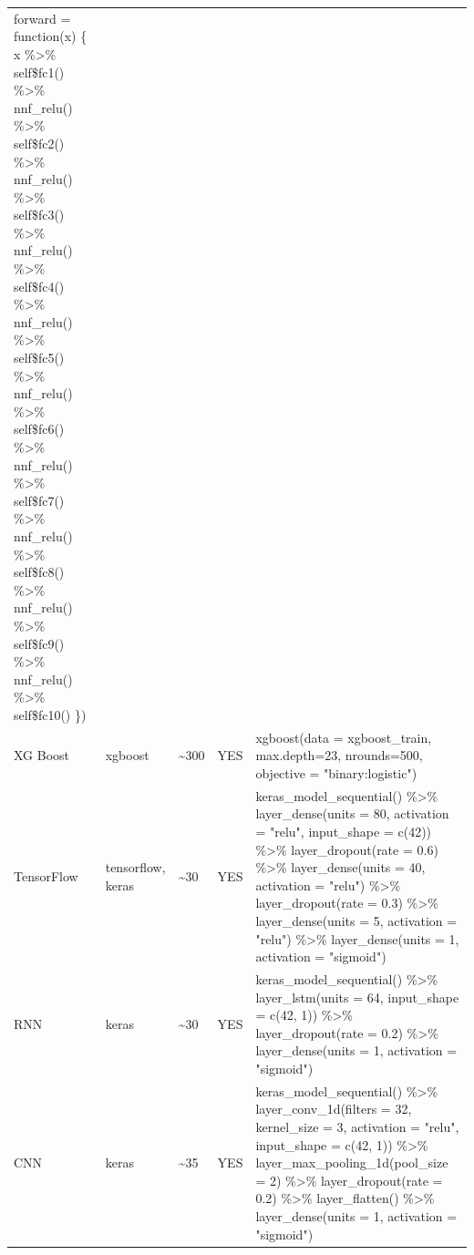 \documentclass[preprint, 3p,
authoryear]{elsarticle} %
\begin{document}
\begin{landscape}
\begin{table}[!h]
{\begin{tabular}[t]{>{\raggedright\arraybackslash}p{1cm}>{\raggedright\arraybackslash}p{1cm}>{\raggedright\arraybackslash}p{1cm}>{\raggedright\arraybackslash}p{1cm}>{\raggedright\arraybackslash}p{13cm}}
  forward = function(x) \{  x \%>\% 
      self\$fc1() \%>\%  nnf\_relu() \%>\%  self\$fc2() \%>\% nnf\_relu() \%>\% self\$fc3() \%>\%  nnf\_relu() \%>\% self\$fc4() \%>\% nnf\_relu() \%>\% self\$fc5() \%>\% nnf\_relu() \%>\% self\$fc6() \%>\%      nnf\_relu() \%>\%  self\$fc7() \%>\%  nnf\_relu() \%>\%  self\$fc8() \%>\%  nnf\_relu() \%>\% self\$fc9() \%>\%  nnf\_relu() \%>\% self\$fc10() \})\\
XG Boost & xgboost & \textasciitilde{}300 & YES & xgboost(data = xgboost\_train, max.depth=23, nrounds=500, objective = "binary:logistic")\\
TensorFlow & tensorflow, keras & \textasciitilde{}30 & YES & keras\_model\_sequential() \%>\% layer\_dense(units = 80, activation = "relu", input\_shape = c(42)) \%>\%  layer\_dropout(rate = 0.6) \%>\%  layer\_dense(units = 40, activation = "relu") \%>\%  layer\_dropout(rate = 0.3) \%>\%  layer\_dense(units = 5, activation = "relu") \%>\%   layer\_dense(units = 1, activation = "sigmoid")\\
RNN & keras & \textasciitilde{}30 & YES & keras\_model\_sequential() \%>\%  layer\_lstm(units = 64, input\_shape = c(42, 1)) \%>\%  layer\_dropout(rate = 0.2) \%>\%  layer\_dense(units = 1, activation = "sigmoid")\\
CNN & keras & \textasciitilde{}35 & YES & keras\_model\_sequential() \%>\%  layer\_conv\_1d(filters = 32, kernel\_size = 3, activation = "relu", input\_shape = c(42, 1)) \%>\%  layer\_max\_pooling\_1d(pool\_size = 2) \%>\%
layer\_dropout(rate = 0.2) \%>\%  layer\_flatten() \%>\%  layer\_dense(units = 1, activation = "sigmoid")\\
\bottomrule
\end{tabular}}
\end{table}
\end{landscape}

\renewcommand\refname{References}

\end{document}

